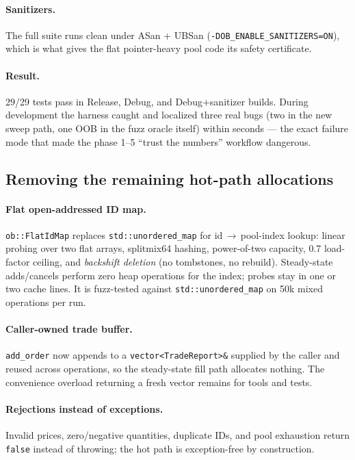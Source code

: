\documentclass[11pt,a4paper]{article}
\begin{document}
\paragraph{Sanitizers.} The full suite runs clean under ASan + UBSan
(\texttt{-DOB\_ENABLE\_SANITIZERS=ON}), which is what gives the flat
pointer-heavy pool code its safety certificate.

\paragraph{Result.} 29/29 tests pass in Release, Debug, and
Debug+sanitizer builds. During development the harness caught and localized
three real bugs (two in the new sweep path, one OOB in the fuzz oracle
itself) within seconds --- the exact failure mode that made the phase 1--5
``trust the numbers'' workflow dangerous.

\subsection{Removing the remaining hot-path allocations}

\paragraph{Flat open-addressed ID map.} \texttt{ob::FlatIdMap} replaces
\texttt{std::unordered\_map} for id\,$\to$\,pool-index lookup: linear
probing over two flat arrays, splitmix64 hashing, power-of-two capacity,
0.7 load-factor ceiling, and \emph{backshift deletion} (no tombstones, no
rebuild). Steady-state adds/cancels perform zero heap operations for the
index; probes stay in one or two cache lines. It is fuzz-tested against
\texttt{std::unordered\_map} on 50k mixed operations per run.

\paragraph{Caller-owned trade buffer.} \texttt{add\_order} now appends to a
\texttt{vector<TradeReport>\&} supplied by the caller and reused across
operations, so the steady-state fill path allocates nothing. The
convenience overload returning a fresh vector remains for tools and tests.

\paragraph{Rejections instead of exceptions.} Invalid prices, zero/negative
quantities, duplicate IDs, and pool exhaustion return \texttt{false}
instead of throwing; the hot path is exception-free by construction.
\end{document}
